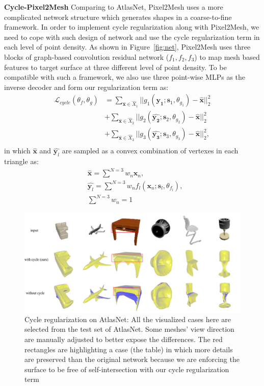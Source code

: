 \noindent\textbf{Cycle-Pixel2Mesh}
Comparing to AtlasNet, Pixel2Mesh uses a more complicated network structure which generates shapes in a coarse-to-fine framework. In order to implement cycle regularization along with Pixel2Mesh, we need to cope with such design of network and use the cycle regularization term in each level of point density.
As shown in Figure~\ref{fig:net}, Pixel2Mesh uses three blocks of graph-based convolution residual network ($f_1,f_2,f_3$) to map mesh based features to target surface at three different level of point density. To be compatible with such a framework, we also use three point-wise MLPs as the inverse decoder and form our regularization term as:
\begin{equation}
\begin{aligned}
\mathcal{L}_{cycle}(\theta_f,\theta_g) 
&= \sum_{\hat{\mathbf{x}} \in \hat{X}_1}||g_{1}(\hat{\mathbf{y_1}};\mathbf{s}_1,\theta_{g_1}) - \hat{\mathbf{x}}||_2^2\\
&+ \sum_{\hat{\mathbf{x}} \in \hat{X}_2}||g_{2}(\hat{\mathbf{y_2}};\mathbf{s}_2,\theta_{g_2}) - \hat{\mathbf{x}}||_2^2\\
&+ \sum_{\hat{\mathbf{x}} \in \hat{X}_3}||g_{3}(\hat{\mathbf{y_3}};\mathbf{s}_3,\theta_{g_3}) - \hat{\mathbf{x}}||_2^2,\\
\end{aligned}
\end{equation}
in which $\hat{\mathbf{x}}$ and $\hat{\mathbf{y}_l}$ are sampled as a convex combination of vertexes in each triangle as:
\begin{equation}
\begin{aligned}
&\hat{\mathbf{x}} = \sum^{N=3} w_n\mathbf{x}_n, \\
&\hat{\mathbf{y}_l} = \sum^{N=3} w_nf_l(\mathbf{x}_n;\mathbf{s}_l,\theta_{f_l}),\\
&\sum^{N=3} w_n = 1
\end{aligned}
\end{equation}
\begin{figure}[t]
	\centering
	\includegraphics[width=\linewidth]{img/atlas/svr}
	\caption{Cycle regularization on AtlasNet: All the visualized cases here are selected from the test set of AtlasNet. Some meshes' view direction are manually adjusted to better expose the differences. The red rectangles are highlighting a case (the table) in which more details are preserved than the original network because we are enforcing the surface to be free of self-intersection with our cycle regularization term}
	\label{fig:svr}
\end{figure}
